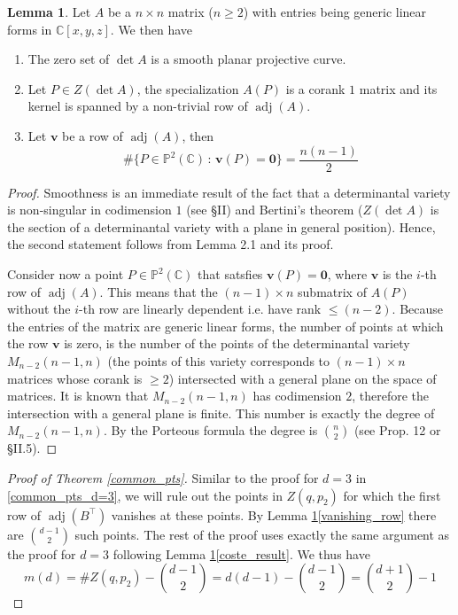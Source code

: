 \documentclass[a4paper,11pt]{amsart}%
\newcommand\sep{\,:\,}
\renewcommand\C{\mathbb{C}} %
\newcommand\C{\mathbb{C}}
\newcommand\adj{\operatorname{adj}}
\renewcommand\P{\mathbb{P}}
\theoremstyle{definition}
\newtheorem{lemma}[theorem]{Lemma}
\begin{document}
\begin{lemma}\label{generic_mat}
Let $A$ be a $n\times n$ matrix ($n\ge 2$) with entries being generic linear forms in $\C[x,y,z]$. We then have 
\begin{enumerate}[label=\alph*.)]
\item The zero set of $\det A$ is a smooth planar projective curve.
\item \label{coste_result} Let $P\in Z(\det A)$, the specialization $A(P)$  is a corank $1$ matrix and its kernel is spanned by a non-trivial row of $\adj(A)$.
\item \label{vanishing_row} Let $\bm v$ be a row of $\adj(A)$, then 
$$\#\{P\in \P^2(\C) \sep \bm v(P) = \bm 0\} = \frac {n(n-1)}2$$
\end{enumerate}
\end{lemma}
\begin{proof}
Smoothness is an immediate result of the fact that a determinantal 
variety is non-singular in codimension $1$ (see \cite{arbarello} \S II) and Bertini's theorem ($Z(\det A)$ is the section of a determinantal 
variety with a plane in general position). Hence, the second statement follows from \cite{coste} Lemma 2.1 and its proof.

Consider now a point $P\in \P^2(\C)$ that satsfies $\bm v(P)=\bm 0$, where $\bm v$ is the $i$-th row of 
$\adj(A)$. This means that the $(n-1)\times n$ submatrix of $A(P)$ without the $i$-th row are linearly dependent i.e. have rank $\le (n-2)$. 
Because the entries of the matrix are generic linear forms, the number 
of points at which the row $\bm v$ is zero, is the number of the points of the determinantal variety $M_{n-2}(n-1,n)$ (the points of this variety 
corresponds to $(n-1)\times n$ matrices whose corank is 
$\ge 2$) intersected with a general plane on the space of matrices. It is known that $M_{n-2}(n-1,n)$ has codimension $2$, therefore the 
intersection with a general plane is finite. This number is exactly the degree of $M_{n-2}(n-1,n)$. By the Porteous formula the degree is $\binom n2$ (see \cite{harris} Prop. 12 
or \cite{arbarello} \S II.5).
\end{proof}

\begin{proof}[Proof of Theorem \ref{common_pts}]
Similar to the proof for $d=3$ in \ref{common_pts_d=3}, we will rule out the points in $Z(q,p_2)$ for which the first row of $\adj(B^\top)$ vanishes at these points. 
By Lemma \ref{generic_mat}\ref{vanishing_row} there are $\binom {d-1}2$ such points. The rest of the proof uses exactly the same argument as the proof for $d=3$ following Lemma 
\ref{generic_mat}\ref{coste_result}. We thus have 
$$ m(d) =\# Z(q,p_2) - \binom {d-1}2 = d(d-1) - \binom {d-1}2 = \binom{d+1}2  - 1$$
\end{proof}





\end{document}
